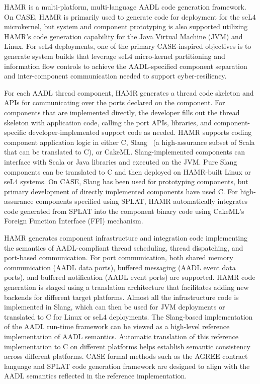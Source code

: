 
HAMR \cite{hamr} is a multi-platform, multi-language
AADL code generation framework.  On CASE, HAMR is primarily used
to generate code for deployment for the seL4 microkernel, but system and component
prototyping is also supported utilizing HAMR's code generation capability
for the Java Virtual Machine (JVM) and Linux.  For seL4 deployments, one of the
primary CASE-inspired objectives is to generate system builds that
leverage seL4 micro-kernel partitioning and information flow
controls to achieve the AADL-specified component separation and
inter-component communication needed to support cyber-resiliency.

For each AADL thread component, HAMR generates a thread code
skeleton and APIs for communicating over the ports declared on
the component.  For components that are implemented directly, the
developer fills out the thread skeleton with application code,
calling the port APIs, libraries, and component-specific
developer-implemented support code as needed.
HAMR supports coding component application logic in either C,
Slang~\cite{slang} (a high-assurance subset of Scala that can be translated to
C), or CakeML.  Slang-implemented components can interface with
Scala or Java libraries and executed on the JVM.  Pure Slang
components can be translated to C and then deployed on HAMR-built
Linux or seL4 systems.  On CASE, Slang has been used for prototyping
components, but primary development of directly implemented
components have used C.  For high-assurance components specified
using SPLAT, HAMR automatically integrates code generated from
SPLAT into the component binary code using CakeML's Foreign
Function Interface (FFI) mechanism.

HAMR generates component infrastructure and integration code
implementing the semantics of AADL-compliant thread scheduling,
thread dispatching, and port-based communication.
For port communication, both shared memory communication (AADL
data ports), buffered messaging (AADL event data ports), and
buffered notification (AADL event ports) are supported.
HAMR code generation is staged using a translation architecture
that facilitates adding new backends for different target
platforms.   Almost all the infrastructure code is implemented
in Slang, which can then be used for JVM deployments or
translated to C for Linux or seL4 deployments.
The Slang-based implementation of the AADL run-time framework
can be viewed as a high-level reference implementation of AADL
semantics.   Automatic translation of this reference
implementation to C on different platforms helps establish
semantic consistency across different platforms. 
CASE formal methods such as the AGREE contract language and SPLAT
code generation framework are designed to align with the AADL
semantics reflected in the reference implementation.  

